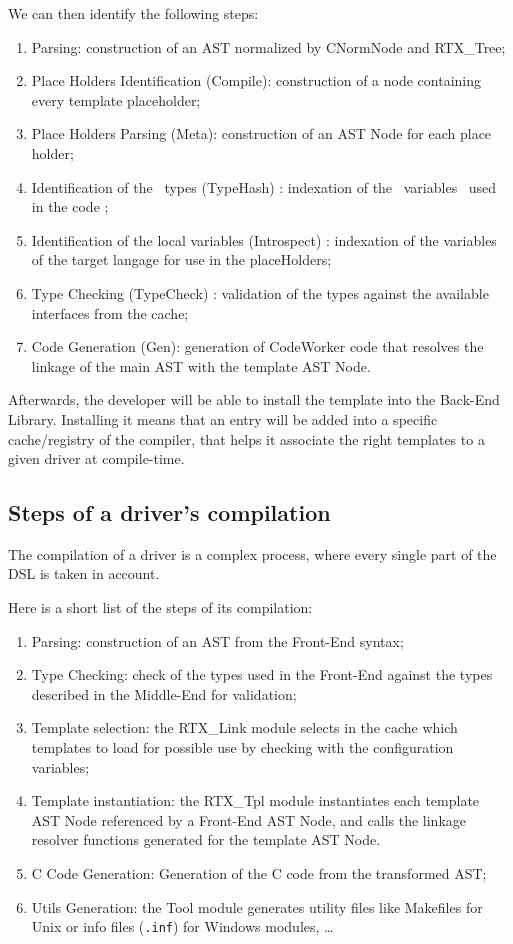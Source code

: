 \documentclass[american]{rtxreport}
\begin{document}
We can then identify the following steps:
\begin{enumerate}
    \item Parsing: construction of an AST normalized by CNormNode and
        RTX\_Tree;
    \item Place Holders Identification (Compile): construction of a node
        containing every template placeholder;
    \item Place Holders Parsing (Meta): construction of an AST Node for each
        place holder;
    \item Identification of the \rtx\ types (TypeHash) : indexation of the
        \rtx\ variables \rtx\ used in the code ;
    \item Identification of the local variables (Introspect) : indexation
        of the variables of the target langage for use in the placeHolders;
    \item Type Checking (TypeCheck) : validation of the types against the
        available interfaces from the cache;
    \item Code Generation (Gen): generation of CodeWorker code that resolves
        the linkage of the main AST with the template AST Node.
\end{enumerate}

Afterwards, the developer will be able to install the template into the
Back-End Library. Installing it means that an entry will be added into a
specific cache/registry of the compiler, that helps it associate the right
templates to a given driver at compile-time.


\subsection{Steps of a driver's compilation}
\label{sec:driverCompilation}

The compilation of a driver is a complex process, where every single part of
the DSL is taken in account.

Here is a short list of the steps of its compilation:
\begin{enumerate}
    \item Parsing: construction of an AST from the Front-End syntax;
    \item Type Checking: check of the types used in the Front-End against the
        types described in the Middle-End for validation;
    \item Template selection: the RTX\_Link module selects in the cache which
        templates to load for possible use by checking with the configuration
        variables;
    \item Template instantiation: the RTX\_Tpl module instantiates each
        template AST Node referenced by a Front-End AST Node, and calls the
        linkage resolver functions generated for the template AST Node.
    \item C Code Generation: Generation of the C code from the transformed
        AST;
    \item Utils Generation: the Tool module generates utility files like
        Makefiles for Unix or info files (\texttt{.inf}) for Windows modules,
        \ldots
\end{enumerate}
\end{document}
